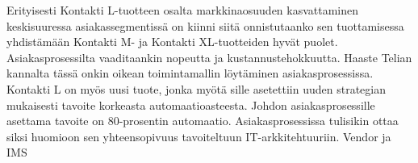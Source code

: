 \documentclass[finnish,12pt,a4paper,pdftex]{article}
\begin{document}
Erityisesti Kontakti L-tuotteen osalta markkinaosuuden kasvattaminen keskisuuressa asiakassegmentissä on kiinni siitä onnistutaanko sen tuottamisessa yhdistämään Kontakti M- ja Kontakti XL-tuotteiden hyvät puolet. \\

Asiakasprosessilta vaaditaankin nopeutta ja kustannustehokkuutta. Haaste Telian kannalta tässä onkin oikean toimintamallin löytäminen asiakasprosessissa. Kontakti L on myös uusi tuote, jonka myötä sille asetettiin uuden strategian mukaisesti tavoite korkeasta automaatioasteesta. Johdon asiakasprosessille asettama tavoite on 80-prosentin automaatio. Asiakasprosessissa tulisikin ottaa siksi huomioon sen yhteensopivuus tavoiteltuun IT-arkkitehtuuriin.
 Vendor ja IMS






\end{document}
